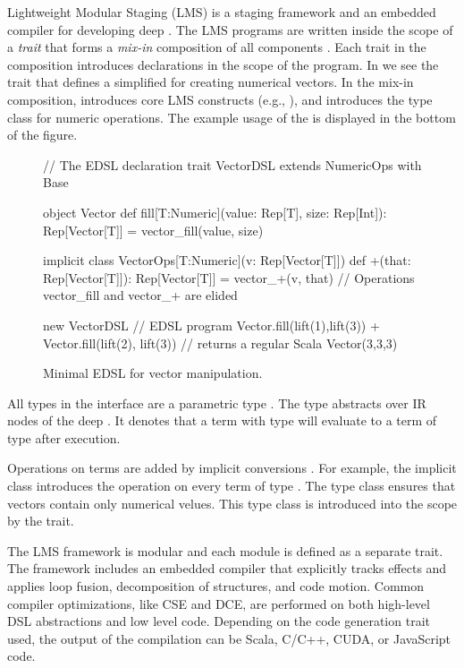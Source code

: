 \documentclass[paper.tex]{subfiles}
\begin{document}
Lightweight Modular Staging (LMS) is a staging \cite{taha_multi-stage_1997} framework and an embedded compiler for developing deep
\edsls. The LMS \edsl programs are written inside the scope of a \emph{trait} that forms a \emph{mix-in} composition of all \edsl components \cite{odersky_scalable_2005}. Each trait in the composition introduces \edsl declarations in the scope of the program. In  we see the trait  that defines a simplified \edsl for creating numerical vectors. In the mix-in composition,  introduces core LMS constructs (e.g., ), and  introduces the type class for numeric operations. The example usage of the \edsl is displayed in the bottom of the figure.


\begin{figure}
\begin{listingtiny}
// The EDSL declaration
trait VectorDSL extends NumericOps with Base {
  object Vector {
    def fill[T:Numeric](value: Rep[T], size: Rep[Int]): Rep[Vector[T]] =
      vector_fill(value, size)
  }

  implicit class VectorOps[T:Numeric](v: Rep[Vector[T]]) {
    def +(that: Rep[Vector[T]]): Rep[Vector[T]] = vector_+(v, that)
  }
  // Operations vector_fill and vector_+ are elided
}

new VectorDSL { // EDSL program
  Vector.fill(lift(1),lift(3)) + Vector.fill(lift(2), lift(3))
} // returns a regular Scala Vector(3,3,3)
\end{listingtiny}
\caption{\label{lst:lms} Minimal EDSL for vector manipulation.}
\end{figure}

All types in the  interface are a parametric type . The type  abstracts over IR nodes of the deep \edsl. It denotes that a term with type  will evaluate to a term of type  after \edsl execution.

Operations on  terms are added by implicit conversions \cite{oliveira_type_2010}. For example, the implicit class  introduces the \code{+} operation on every term of type . The type class  ensures that vectors contain only numerical velues. This type class is introduced into the scope by the  trait.

The LMS framework is modular and each module is defined as a separate trait. The framework includes an embedded compiler that explicitly tracks effects and applies loop fusion, decomposition of structures, and code motion. Common compiler optimizations, like CSE and DCE, are performed on both high-level DSL abstractions and low level code. Depending on the code generation trait used, the output of the compilation can be Scala, C/C++, CUDA, or JavaScript code.
\end{document}

